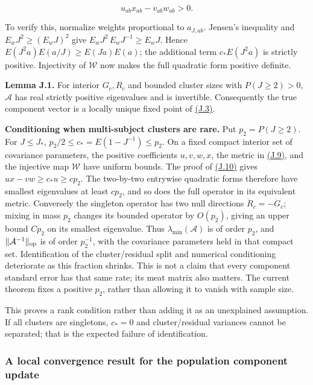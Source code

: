 \documentclass[11pt]{article}
\begin{document}
\begin{equation*}
u_{ab}x_{ab}-v_{ab}w_{ab}>0.
\tag{J.10}\label{eq:J.10}
\end{equation*}

To verify this, normalize weights proportional to \(a_{J,ab}\). Jensen's inequality and \(E_wJ^2\geq(E_wJ)^2\) give
\(E_wJ^2\,E_wJ^{-1}\geq E_wJ\). Hence
\(E(J^2a)E(a/J)\geq E(Ja)E(a)\); the additional term \(c_*E(J^2a)\) is strictly positive. Injectivity of \(\mathscr W\) now makes the full quadratic form positive definite.

\label{res:Lemma-J.1}
\textbf{Lemma J.1.} For interior \({G_c},{R_c}\) and bounded cluster sizes with \(P(J\geq2)>0\), \(\mathcal A\) has real strictly positive eigenvalues and is invertible. Consequently the true component vector is a locally unique fixed point of \hyperref[eq:J.3]{(J.3)}.

\textbf{Conditioning when multi-subject clusters are rare.} Put \(p_2=P(J\ge2)\). For \(J\le J_*\),
\(p_2/2\le c_*=E(1-J^{-1})\le p_2\).
On a fixed compact interior set of covariance parameters, the positive coefficients \(u,v,w,x\), the metric in \hyperref[eq:J.9]{(J.9)}, and the injective map \(\mathscr W\) have uniform bounds. The proof of \hyperref[eq:J.10]{(J.10)} gives \(ux-vw\ge c_*u\ge cp_2\). The two-by-two entrywise quadratic forms therefore have smallest eigenvalues at least \(cp_2\), and so does the full operator in its equivalent metric. Conversely the singleton operator has two null directions \(\dot R_c=-\dot G_c\); mixing in mass \(p_2\) changes its bounded operator by \(O(p_2)\), giving an upper bound \(Cp_2\) on its smallest eigenvalue. Thus \(\lambda_{\min}(\mathcal A)\) is of order \(p_2\), and \(\|\mathcal A^{-1}\|_{\rm op}\) is of order \(p_2^{-1}\), with the covariance parameters held in that compact set. Identification of the cluster/residual split and numerical conditioning deteriorate as this fraction shrinks. This is not a claim that every component standard error has that same rate; its meat matrix also matters. The current theorem fixes a positive \(p_2\), rather than allowing it to vanish with sample size.

This proves a rank condition rather than adding it as an unexplained assumption. If all clusters are singletons, \(c_*=0\) and cluster/residual variances cannot be separated; that is the expected failure of identification.

\subsubsection{A local convergence result for the population component update}\label{sec:J.2.3}
\end{document}
